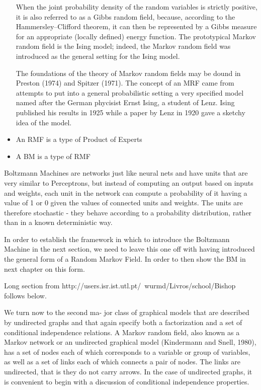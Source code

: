 \documentclass[twoside,english]{uiofysmaster}
\begin{document}
\begin{itemize}
	When the joint probability density of the random variables is strictly positive, it is also referred to as a Gibbs random field, because, according to the Hammersley–Clifford theorem, it can then be represented by a Gibbs measure for an appropriate (locally defined) energy function. The prototypical Markov random field is the Ising model; indeed, the Markov random field was introduced as the general setting for the Ising model.

	The foundations of the theory of Markov random fields may be dound in Preston (1974) and Spitzer (1971). The concept of an MRF came from attempts to put into a general probabilistic setting a very specified model named after the German phycisist Ernst Ising, a student of Lenz. Ising published his results in 1925 while a paper by Lenz in 1920 gave a sketchy idea of the model.
	\item An RMF is a type of Product of Experts
	\item A BM is a type of RMF
\end{itemize}

Boltzmann Machines are networks just like neural nets and have units that are very similar to Perceptrons, but instead of computing an output based on inputs and weights, each unit in the network can compute a probability of it having a value of 1 or 0 given the values of connected units and weights. The units are therefore stochastic - they behave according to a probability distribution, rather than in a known deterministic way. 


In order to establish the framework in which to introduce the Boltzmann Machine in the next section, we need to leave this one off with having introduced the general form of a Random Markov Field. In order to then show the BM in next chapter on this form.

Long section from http://users.isr.ist.utl.pt/~wurmd/Livros/school/Bishop%
\cite{Bishop2006} follows below.

We turn now to the second ma- jor class of graphical models that are described by undirected graphs and that again specify both a factorization and a set of conditional independence relations.
A Markov random field, also known as a Markov network or an undirected graphical model (Kindermann and Snell, 1980), has a set of nodes each of which corresponds to a variable or group of variables, as well as a set of links each of which connects a pair of nodes. The links are undirected, that is they do not carry arrows. In the case of undirected graphs, it is convenient to begin with a discussion of conditional independence properties.
\end{document}
